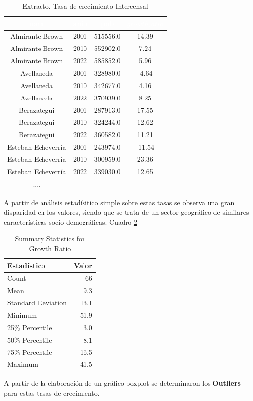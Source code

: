 \documentclass{article}
\theoremstyle{mytheoremstyle}
\theoremstyle{mytheoremstyle}
\theoremstyle{myproblemstyle}
\begin{document}
  \begin{table}[htb]
    \centering
    \begin{tabular}{|c|c|c|c|}
    \hline
    \textbf{\cellcolor[rgb]{0,0.231,0.427}\textcolor{white}{nam}} &
     \textbf{\cellcolor[rgb]{0,0.231,0.427}\textcolor{white}{anio}}
      & \textbf{\cellcolor[rgb]{0,0.231,0.427}\textcolor{white}{pob}}
       & \textbf{\cellcolor[rgb]{0,0.231,0.427}\textcolor{white}{$growth_ratio$}} \\ \hline
    Almirante Brown & 2001 & 515556.0 & 14.39 \\
    Almirante Brown & 2010 & 552902.0 & 7.24 \\
    Almirante Brown & 2022 & 585852.0 & 5.96 \\
    Avellaneda & 2001 & 328980.0 & -4.64 \\
    Avellaneda & 2010 & 342677.0 & 4.16 \\
    Avellaneda & 2022 & 370939.0 & 8.25 \\
    Berazategui & 2001 & 287913.0 & 17.55 \\
    Berazategui & 2010 & 324244.0 & 12.62 \\
    Berazategui & 2022 & 360582.0 & 11.21 \\
    Esteban Echeverría & 2001 & 243974.0 & -11.54 \\
    Esteban Echeverría & 2010 & 300959.0 & 23.36 \\
    Esteban Echeverría & 2022 & 339030.0 & 12.65 \\
      ....& & & \\
  
    \hline
    \end{tabular}
    \caption{Extracto. Tasa de crecimiento Intercensal}
  \label{tab:RatiosAll}
    \end{table}
  

  A partir de  análisis estadísitico simple sobre estas tasas se observa una gran disparidad en los valores,
  siendo que se trata de un sector geográfico de similares características socio-demográficas. Cuadro \ref{tab:summary_growth_ratio}
\begin{table}[htbp]
    \centering
    \begin{tabular}{lr}
        \hline
        \textbf{Estadístico} & \textbf{Valor} \\
        \hline
        Count & 66\\
        Mean & 9.3 \\
        Standard Deviation & 13.1 \\
        Minimum & -51.9 \\
        25\% Percentile & 3.0 \\
        50\% Percentile & 8.1\\
        75\% Percentile & 16.5 \\
        Maximum & 41.5 \\
        \hline
    \end{tabular}
    \caption{Summary Statistics for Growth Ratio}
    \label{tab:summary_growth_ratio}
\end{table}
\newline
A partir de la elaboración de un gráfico boxplot se determinaron los \textbf{Outliers} para estas tasas de crecimiento.
\end{document}
